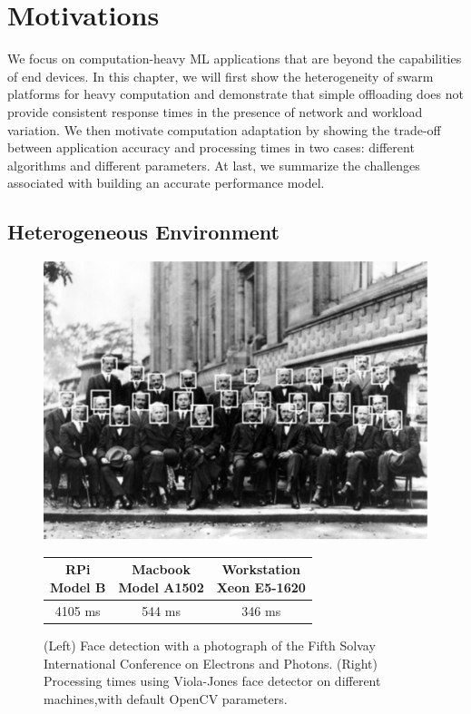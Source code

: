 \section{Motivations}
\label{sec:motivation}

We focus on computation-heavy ML applications that are beyond the capabilities
of end devices. In this chapter, we will first show the heterogeneity of swarm
platforms for heavy computation and demonstrate that simple offloading does not
provide consistent response times in the presence of network and workload
variation. We then motivate computation adaptation by showing the trade-off
between application accuracy and processing times in two cases: different
algorithms and different parameters. At last, we summarize the challenges
associated with building an accurate performance model.

\subsection{Heterogeneous Environment}

\begin{figure}
  \begin{minipage}{0.4\textwidth}
    \centering
    \includegraphics[width=.9\textwidth]{figures/physicist.pdf}
    \label{fig:physicist}
  \end{minipage}%
  \begin{minipage}{0.6\textwidth}
    \centering
    \begin{tabular}{c c c}
      \toprule
      \specialcell{RPi\\Model B}
      & \specialcell{Macbook \\ Model A1502}
      & \specialcell{Workstation\\Xeon E5-1620} \\
      \midrule
      4105 ms & 544 ms & 346 ms \\
      \bottomrule
    \end{tabular}
  \end{minipage}
  \caption{(Left) Face detection with a photograph of the Fifth Solvay
    International Conference on Electrons and Photons. (Right) Processing times
    using Viola-Jones face detector on different machines,with default OpenCV
    parameters.}
  \label{fig:capabilities}
\end{figure}

